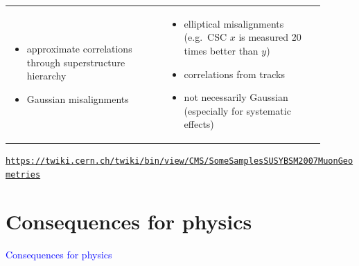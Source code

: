 \documentclass[compress]{beamer}
\begin{document}
\begin{frame}
\begin{tabular}{p{0.45\linewidth} p{0.45\linewidth}}
\begin{itemize}
\vspace{1 cm}
\item approximate correlations through superstructure hierarchy
\item Gaussian misalignments
\end{itemize} &

\vspace{-0.9 cm}
\begin{itemize}
\item elliptical misalignments (e.g.\ CSC $x$ is measured 20 times better than $y$)
\item correlations from tracks
\item not necessarily Gaussian (especially for systematic effects)
\end{itemize}
\end{tabular}

\vspace{-0.25 cm}
\textcolor{blue}{\scriptsize \tt \href{https://twiki.cern.ch/twiki/bin/view/CMS/SomeSamplesSUSYBSM2007MuonGeometries}{https://twiki.cern.ch/twiki/bin/view/CMS/SomeSamplesSUSYBSM2007MuonGeometries}}
\end{frame}

\section*{Consequences for physics}

\begin{frame}
\begin{center}
\Huge \textcolor{blue}{Consequences for physics}
\end{center}
\end{frame}



\end{document}

